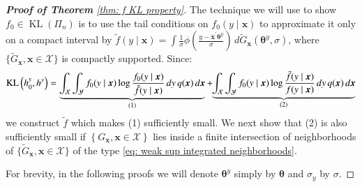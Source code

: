 \begin{proof}[\hypertarget{proof of thm KL property}{\textbf{Proof of Theorem}} \ref{thm: f KL property}]
The technique we will use to show $f_0 \in \operatorname{KL}\left(\Pi_n\right)$ is to use the tail conditions on $f_0(y \mid \boldsymbol{x})$ to approximate it only on a compact interval by $\tilde{f}(y \mid \boldsymbol{x})=\int \frac{1}{\sigma} \phi(\frac{y-\bar{\boldsymbol{x}}^{\prime} \boldsymbol{\theta}^y}{\sigma}) \, d \tilde{G}_{\boldsymbol{x}}( \boldsymbol{\theta}^y, \sigma)$, where $\{\tilde{G}_{\boldsymbol{x}}, \boldsymbol{x} \in \mathcal{X} \}$ is compactly supported. Since:
$$
\operatorname{KL}\left(h^y_0, h^y\right)=\underbrace{\int_{\mathcal{X}} \int_{\mathcal{Y}} f_0(y \mid \boldsymbol{x}) \log \frac{f_0(y \mid \boldsymbol{x})}{\tilde{f}(y \mid \boldsymbol{x})} \, d y \, q(\boldsymbol{x}) \, d \boldsymbol{x}}_{(1)} +\hspace{-0.1cm} \underbrace{\int_{\mathcal{X}} \int_{\mathcal{Y}} f_0(y \mid \boldsymbol{x}) \log \frac{\tilde{f}(y \mid \boldsymbol{x})}{f(y \mid \boldsymbol{x})}  \, d y \, q(\boldsymbol{x}) \, d \boldsymbol{x}}_{(2)}
$$
we construct $\tilde{f}$ which makes (1) sufficiently small. We next show that (2) is also sufficiently small if $\left\{G_{\boldsymbol{x}}, \boldsymbol{x} \in \mathcal{X}\right\}$ lies inside a finite intersection of neighborhoods of $\{\tilde{G}_{\boldsymbol{x}}, \boldsymbol{x} \in \mathcal{X}\}$ of the type \eqref{eq: weak sup integrated neighborhoods}.

For brevity, in the following proofs we will denote $\boldsymbol{\theta}^y$ simply by $\boldsymbol{\theta}$ and $\sigma_y$ by $\sigma$.


\end{proof}
